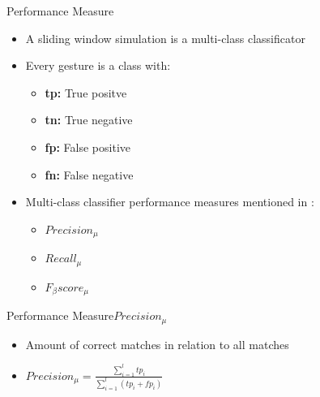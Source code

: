 \begin{frame}{Performance Measure}
    \begin{center}
        \begin{itemize}
            \item A sliding window simulation is a multi-class classificator
            
            \item Every gesture is a class with:
            
            \begin{itemize}
                \item \textbf{tp:} True positve
                
                \item \textbf{tn:} True negative
                
                \item \textbf{fp:} False positive
                
                \item \textbf{fn:} False negative
            \end{itemize}
            
            \item Multi-class classifier performance measures mentioned in \cite{sokolova2009systematic}:
            
            \begin{itemize}
                \item $Precision_{\mu}$
                
                \item $Recall_{\mu}$
                
                \item $F_{\beta}score_{\mu}$
            \end{itemize}
        \end{itemize}
    \end{center}
\end{frame}

\begin{frame}{Performance Measure}{$Precision_{\mu}$}
    \begin{center}
        \begin{itemize}
            \item Amount of correct matches in relation to all matches
            
            \item $Precision_{\mu} = \frac{\sum \limits_{i=1}^{l} tp_i}{\sum \limits_{i=1}^{l} (tp_i + fp_i)}$
        \end{itemize}
    \end{center}
\end{frame}

